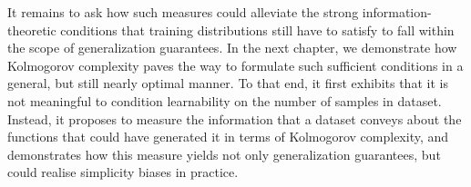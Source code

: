 It remains to ask how such measures could alleviate the strong information-theoretic conditions that training distributions still have to satisfy to fall within the scope of generalization guarantees.
In the next chapter, we demonstrate how Kolmogorov complexity paves the way to formulate such sufficient conditions in a general, but still nearly optimal manner.
To that end, it first exhibits that it is not meaningful to condition learnability on the number of samples in dataset. 
Instead, it proposes to measure the information that a dataset conveys about the functions that could have generated it in terms of Kolmogorov complexity, and demonstrates how this measure yields not only generalization guarantees, but could realise simplicity biases in practice.